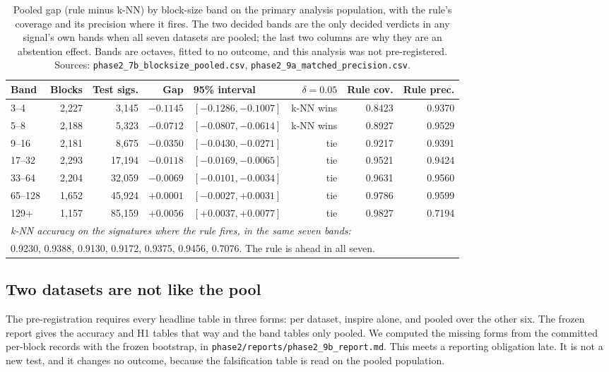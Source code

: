 \documentclass[11pt]{article}
\begin{document}
\begin{table}[htbp]
\centering
\caption{Pooled gap (rule minus k-NN) by block-size band on the primary
analysis population, with the rule's coverage and its precision where it
fires. The two decided bands are the only decided verdicts in any signal's own bands when all seven datasets are pooled; the last two columns are why they are an
abstention effect. Bands are octaves, fitted to no outcome, and this analysis
was not pre-registered. Sources:
\texttt{phase2\_7b\_blocksize\_pooled.csv},
\texttt{phase2\_9a\_matched\_precision.csv}.}
\label{tab:blocksize}
\small
\begin{tabular}{lrrrlrrr}
\toprule
Band & Blocks & Test sigs. & Gap & 95\% interval & $\delta{=}0.05$ & Rule cov. & Rule prec. \\
\midrule
3--4 & 2{,}227 & 3{,}145 & $-0.1145$ & $[-0.1286, -0.1007]$ & k-NN wins & 0.8423 & 0.9370 \\
5--8 & 2{,}188 & 5{,}323 & $-0.0712$ & $[-0.0807, -0.0614]$ & k-NN wins & 0.8927 & 0.9529 \\
9--16 & 2{,}181 & 8{,}675 & $-0.0350$ & $[-0.0430, -0.0271]$ & tie & 0.9217 & 0.9391 \\
17--32 & 2{,}293 & 17{,}194 & $-0.0118$ & $[-0.0169, -0.0065]$ & tie & 0.9521 & 0.9424 \\
33--64 & 2{,}204 & 32{,}059 & $-0.0069$ & $[-0.0101, -0.0034]$ & tie & 0.9631 & 0.9560 \\
65--128 & 1{,}652 & 45{,}924 & $+0.0001$ & $[-0.0027, +0.0031]$ & tie & 0.9786 & 0.9599 \\
129+ & 1{,}157 & 85{,}159 & $+0.0056$ & $[+0.0037, +0.0077]$ & tie & 0.9827 & 0.7194 \\
\midrule
\multicolumn{8}{l}{\emph{k-NN accuracy on the signatures where the rule fires, in the same seven bands:}} \\
\multicolumn{8}{l}{0.9230, 0.9388, 0.9130, 0.9172, 0.9375, 0.9456, 0.7076. The rule is ahead in all seven.} \\
\bottomrule
\end{tabular}
\end{table}

\subsection{Two datasets are not like the pool}
\label{sec:per-dataset}

The pre-registration requires every headline table in three forms: per
dataset, inspire alone, and pooled over the other six. The frozen report gives
the accuracy and H1 tables that way and the band tables only pooled. We
computed the missing forms from the committed per-block records with the
frozen bootstrap, in \texttt{phase2/reports/phase2\_9b\_report.md}. This meets
a reporting obligation late. It is not a new test, and it changes no outcome,
because the falsification table is read on the pooled population.
\end{document}
